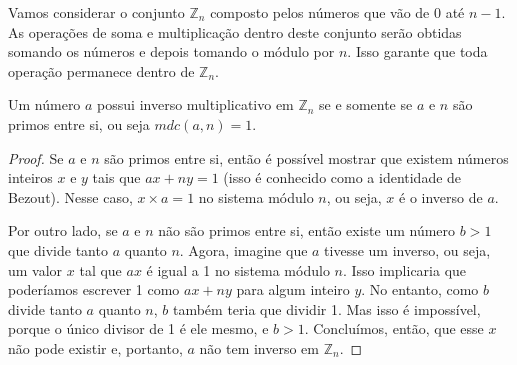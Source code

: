 Vamos considerar o conjunto $\mathbb{Z}_n$ composto pelos números que vão de $0$ até $n-1$.
As operações de soma e multiplicação dentro deste conjunto serão obtidas somando os números e depois tomando o módulo por $n$.
Isso garante que toda operação permanece dentro de $\mathbb{Z}_n$.

\begin{proposition}
\label{prop:inverso}
Um número $a$ possui inverso multiplicativo em $\mathbb{Z}_n$ se e somente se $a$ e $n$ são primos entre si, ou seja $mdc(a,n) = 1$.
\end{proposition}
\begin{proof}

Se $a$ e $n$ são primos entre si, então é possível mostrar que existem números inteiros $x$ e $y$ tais que $ax + ny = 1$ (isso é conhecido como a identidade de Bezout).
Nesse caso, $x \times a = 1$ no sistema módulo $n$, ou seja, $x$ é o inverso de $a$.

Por outro lado, se $a$ e $n$ não são primos entre si, então existe um número $b > 1$ que divide tanto $a$ quanto $n$.
Agora, imagine que $a$ tivesse um inverso, ou seja, um valor $x$ tal que $ax$ é igual a 1 no sistema módulo $n$.
Isso implicaria que poderíamos escrever 1 como $ax + ny$ para algum inteiro $y$.
No entanto, como $b$ divide tanto $a$ quanto $n$, $b$ também teria que dividir 1.
Mas isso é impossível, porque o único divisor de 1 é ele mesmo, e $b > 1$. Concluímos, então, que esse $x$ não pode existir e, portanto, $a$ não tem inverso em $\mathbb{Z}_n$.
\end{proof}


